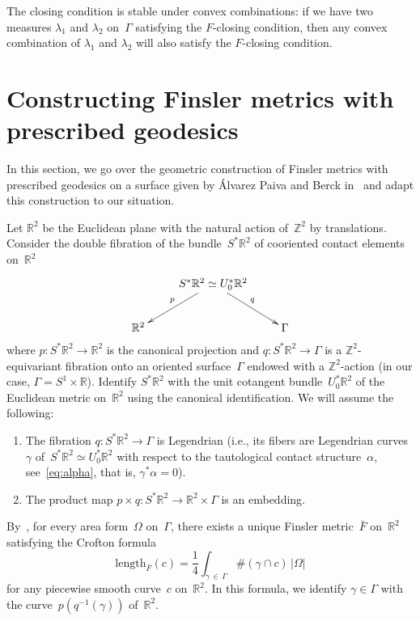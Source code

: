 \documentclass[AHL,Unicode,longabstracts,published]{cedram}
\newcommand{\Z}{\mathbb{Z}}
\newcommand{\R}{\mathbb{R}}
\newcommand{\length}{\mathrm{length}}
\newcommand{\ie}{i.e.}
\begin{document}
\begin{rema}\label{rem:closing}
The closing condition is stable under convex combinations: if we have two measures $\lambda_{1}$ and $\lambda_{2}$ on~$\Gamma$ satisfying the $F$-closing condition, then any convex combination of $\lambda_{1}$ and $\lambda_{2}$ will also satisfy the $F$-closing condition.
\end{rema}



\section{Constructing Finsler metrics with prescribed geodesics} \label{sec:prescribe}

In this section, we go over the geometric construction of Finsler metrics with prescribed geodesics on a surface given by \'Alvarez Paiva and Berck in~\cite{AB} and adapt this construction to our situation.

Let $\R^2$ be the Euclidean plane with the natural action of~$\Z^2$ by translations. Consider the double fibration of the bundle~$S^* \R^2$ of cooriented contact elements on~$\R^2$
\begin{equation}\label{eq:doublefibration}
\xymatrix{ & S^* \R^2 \simeq U_0^* \R^2 \ar[dl]_p \ar[dr]^{q} \\
\R^2 & & \Gamma}
\end{equation}
where $p:S^*\R^2 \to \R^2$ is the canonical projection and $q:S^*\R^2 \to \Gamma$ is a $\Z^2$-equivariant fibration onto an oriented surface~$\Gamma$ endowed with a $\Z^2$-action (in our case, $\Gamma=S^1 \times \R$). Identify $S^* \R^2$ with the unit cotangent bundle~$U_0^*\R^2$ of the Euclidean metric on~$\R^2$ using the canonical identification. We will assume the following:
\begin{enumerate}
\item\label{legendre} The fibration \mbox{$q:S^*\R^2 \to \Gamma$} is Legendrian (\ie, its fibers are Legendrian curves~$\gamma$ of~$S^*\R^2 \simeq U_0^*\R^2$ with respect to the tautological contact structure~$\alpha$, see~\eqref{eq:alpha}, that is, $\gamma^* \alpha=0$). 
\item \label{embedding} The product map $p \times q : S^*\R^2 \to \R^2 \times \Gamma$ is an embedding.
\end{enumerate}

By~\cite[Theorem~3.3]{AB}, for every area form~$\Omega$ on~$\Gamma$, there exists a unique Finsler metric~$\bar{F}$ on~$\R^2$ satisfying the Crofton formula
\[
\length_{\bar{F}}(c)=\frac{1}{4} \int_{\gamma\,\in\,\Gamma} \#(\gamma\cap c) \, |\Omega|
\]
for any piecewise smooth curve~$c$ on~$\R^2$. In this formula, we identify $\gamma \in \Gamma$ with the curve~$p(q^{-1}(\gamma))$ of~$\R^2$.
\end{document}
